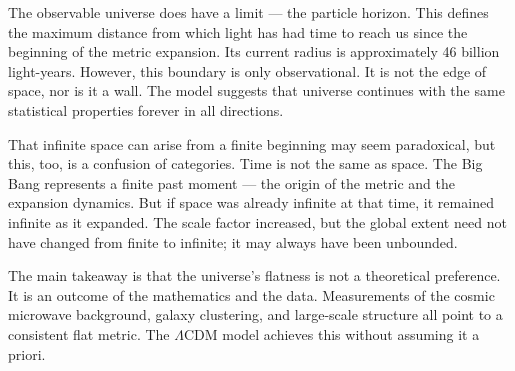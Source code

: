The observable universe does have a limit — the particle horizon. This defines the maximum distance from which light has had time to reach us since the beginning of the metric expansion. Its current radius is approximately 46 billion light-years. However, this boundary is only observational. It is not the edge of space, nor is it a wall. The model suggests that universe continues with the same statistical properties forever in all directions.

That infinite space can arise from a finite beginning may seem paradoxical, but this, too, is a confusion of categories. Time is not the same as space. The Big Bang represents a finite past moment — the origin of the metric and the expansion dynamics. But if space was already infinite at that time, it remained infinite as it expanded. The scale factor increased, but the global extent need not have changed from finite to infinite; it may always have been unbounded.

The main takeaway is that the universe's flatness is not a theoretical preference. It is an outcome of the mathematics and the data. Measurements of the cosmic microwave background, galaxy clustering, and large-scale structure all point to a consistent flat metric. The $\Lambda$CDM model achieves this without assuming it a priori. 

